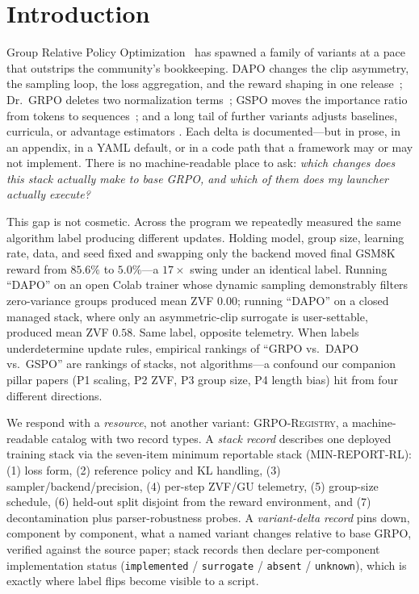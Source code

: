 \section{Introduction}
\label{sec:p6-intro}
Group Relative Policy Optimization~\citep{shao2024deepseekmath, guo2025deepseekr1}
has spawned a family of variants at a pace that outstrips the community's
bookkeeping. DAPO changes the clip asymmetry, the sampling loop, the loss
aggregation, and the reward shaping in one release~\citep{yu2025dapo}; Dr.~GRPO
deletes two normalization terms~\citep{tong2025drgrpo}; GSPO moves the
importance ratio from tokens to sequences~\citep{qwen2025gspo}; and a long tail
of further variants adjusts baselines, curricula, or advantage estimators
\citep{lin2025cppo, nan2025ngrpo, zhang2025scaffgrpo, mcgrpo2025, gift2025,
liu2026gdpo, ichihara2025mogrpo, lu2025grpolead, bytedance2025vapo,
le2025rlzvp}. Each delta is documented---but in prose, in
an appendix, in a YAML default, or in a code path that a framework may or may
not implement. There is no machine-readable place to ask: \emph{which changes
does this stack actually make to base GRPO, and which of them does my launcher
actually execute?}

This gap is not cosmetic. Across the \ours{} program we repeatedly measured the
same algorithm label producing different updates. Holding model, group size,
learning rate, data, and seed fixed and swapping only the backend moved final
GSM8K reward from $85.6\%$ to $5.0\%$---a $17\times$ swing under an identical
label. Running ``DAPO'' on an open Colab trainer whose dynamic sampling
demonstrably filters zero-variance groups produced mean ZVF $0.00$; running
``DAPO'' on a closed managed stack, where only an asymmetric-clip surrogate is
user-settable, produced mean ZVF $0.58$. Same label, opposite telemetry. When
labels underdetermine update rules, empirical rankings of ``GRPO vs.\ DAPO
vs.\ GSPO'' are rankings of stacks, not algorithms---a confound our companion
pillar papers (P1 scaling, P2 ZVF, P3 group size, P4 length bias) hit from four
different directions.

We respond with a \emph{resource}, not another variant:
\textsc{GRPO-Registry}, a machine-readable catalog with two record types.
A \emph{stack record} describes one deployed training stack via the seven-item
minimum reportable stack (MIN-REPORT-RL): (1) loss form, (2) reference policy
and KL handling, (3) sampler/backend/precision, (4) per-step ZVF/GU telemetry,
(5) group-size schedule, (6) held-out split disjoint from the reward
environment, and (7) decontamination plus parser-robustness probes. A
\emph{variant-delta record} pins down, component by component, what a named
variant changes relative to base GRPO, verified against the source paper; stack
records then declare per-component implementation status
(\texttt{implemented} / \texttt{surrogate} / \texttt{absent} / \texttt{unknown}),
which is exactly where label flips become visible to a script.

